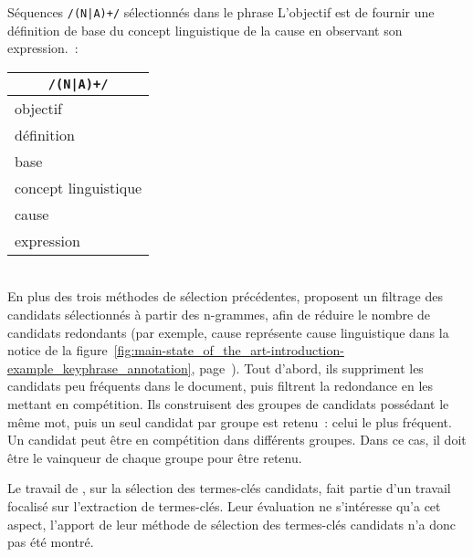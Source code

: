     \begin{example}\label{ex:na+}
      Séquences \texttt{/(N|A)+/} sélectionnés dans le phrase \og{}L'objectif
      est de fournir une définition de base du concept linguistique de la cause
      en observant son expression.\fg{}~:
      \begin{center}
        \begin{tabular}{l}
          \toprule
          \multicolumn{1}{c}{\textbf{\texttt{/(N|A)+/}}}\\
          \hline
          \og{}objectif\fg{}\\
          \og{}définition\fg{}\\
          \og{}base\fg{}\\
          \og{}concept linguistique\fg{}\\
          \og{}cause\\
          \og{}expression\fg{}\\
          \bottomrule
        \end{tabular}
      \end{center}\vspace{.25em}
    \end{example}

    ~\\En plus des trois méthodes de sélection précédentes,
     proposent un filtrage
    des candidats sélectionnés à partir des n-grammes, afin de réduire le nombre
    de candidats redondants (par exemple, \og{}cause\fg{} représente \og{}cause
    linguistique\fg{} dans la notice de la
    figure~\ref{fig:main-state_of_the_art-introduction-example_keyphrase_annotation},
    page~\pageref{fig:main-state_of_the_art-introduction-example_keyphrase_annotation}).
    Tout d'abord, ils suppriment les candidats peu fréquents dans le document,
    puis filtrent la redondance en les mettant en compétition. Ils construisent
    des groupes de candidats possédant le même mot, puis un seul candidat par groupe est
    retenu~: celui le plus fréquent. Un candidat peut être en compétition dans
    différents groupes. Dans ce cas, il doit être le \og{}vainqueur\fg{} de
    chaque groupe pour être retenu.

    Le travail de , sur la
    sélection des termes-clés candidats, fait partie d'un travail focalisé sur
    l'extraction de termes-clés. Leur évaluation ne s'intéresse qu'a cet aspect,
    l'apport de leur méthode de sélection des termes-clés candidats n'a donc pas
    été montré.

